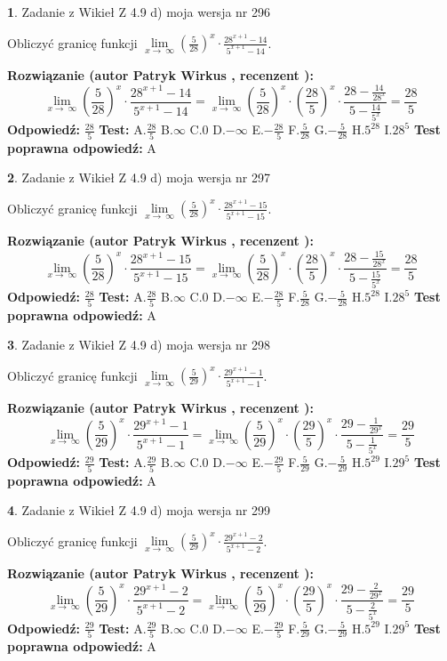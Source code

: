 \documentclass[12pt, a4paper]{article}
\theoremstyle{definition} %
\newtheorem{zad}{}
\newcommand{\zadStart}[1]{\begin{zad}#1\newline}
\newcommand{\zadStop}{\end{zad}}
\newcommand{\rozwStart}[2]{\noindent \textbf{Rozwiązanie (autor #1 , recenzent #2): }\newline}
\newcommand{\rozwStop}{\newline}
\newcommand{\odpStart}{\noindent \textbf{Odpowiedź:}\newline}
\newcommand{\odpStop}{\newline}
\newcommand{\testStart}{\noindent \textbf{Test:}\newline}
\newcommand{\testStop}{\newline}
\newcommand{\kluczStart}{\noindent \textbf{Test poprawna odpowiedź:}\newline}
\newcommand{\kluczStop}{\newline}
\begin{document}
\zadStart{Zadanie z Wikieł Z 4.9 d) moja wersja nr 296}


Obliczyć granicę funkcji  $\lim\limits_{x\to\ \infty}(\frac{5}{28})^{x}\cdot\frac{28^{x+1}-14}{5^{x+1}-14}$.
\zadStop
\rozwStart{Patryk Wirkus}{}
$$\lim\limits_{x\to\ \infty}(\frac{5}{28})^{x}\cdot\frac{28^{x+1}-14}{5^{x+1}-14}=\lim\limits_{x\to\ \infty}(\frac{5}{28})^{x}\cdot(\frac{28}{5})^{x} \cdot \frac{28-\frac{14}{28^{x}}}{5-\frac{14}{5^{x}}} = \frac{28}{5}$$
\rozwStop
\odpStart
$\frac{28}{5}$
\odpStop
\testStart
A.$\frac{28}{5}$ B.$\infty$ C.$0$ D.$-\infty$ E.$-\frac{28}{5}$
F.$\frac{5}{28}$ G.$-\frac{5}{28}$
H.$5^{28}$
I.$28^{5}$
\testStop
\kluczStart
A
\kluczStop



\zadStart{Zadanie z Wikieł Z 4.9 d) moja wersja nr 297}


Obliczyć granicę funkcji  $\lim\limits_{x\to\ \infty}(\frac{5}{28})^{x}\cdot\frac{28^{x+1}-15}{5^{x+1}-15}$.
\zadStop
\rozwStart{Patryk Wirkus}{}
$$\lim\limits_{x\to\ \infty}(\frac{5}{28})^{x}\cdot\frac{28^{x+1}-15}{5^{x+1}-15}=\lim\limits_{x\to\ \infty}(\frac{5}{28})^{x}\cdot(\frac{28}{5})^{x} \cdot \frac{28-\frac{15}{28^{x}}}{5-\frac{15}{5^{x}}} = \frac{28}{5}$$
\rozwStop
\odpStart
$\frac{28}{5}$
\odpStop
\testStart
A.$\frac{28}{5}$ B.$\infty$ C.$0$ D.$-\infty$ E.$-\frac{28}{5}$
F.$\frac{5}{28}$ G.$-\frac{5}{28}$
H.$5^{28}$
I.$28^{5}$
\testStop
\kluczStart
A
\kluczStop



\zadStart{Zadanie z Wikieł Z 4.9 d) moja wersja nr 298}


Obliczyć granicę funkcji  $\lim\limits_{x\to\ \infty}(\frac{5}{29})^{x}\cdot\frac{29^{x+1}-1}{5^{x+1}-1}$.
\zadStop
\rozwStart{Patryk Wirkus}{}
$$\lim\limits_{x\to\ \infty}(\frac{5}{29})^{x}\cdot\frac{29^{x+1}-1}{5^{x+1}-1}=\lim\limits_{x\to\ \infty}(\frac{5}{29})^{x}\cdot(\frac{29}{5})^{x} \cdot \frac{29-\frac{1}{29^{x}}}{5-\frac{1}{5^{x}}} = \frac{29}{5}$$
\rozwStop
\odpStart
$\frac{29}{5}$
\odpStop
\testStart
A.$\frac{29}{5}$ B.$\infty$ C.$0$ D.$-\infty$ E.$-\frac{29}{5}$
F.$\frac{5}{29}$ G.$-\frac{5}{29}$
H.$5^{29}$
I.$29^{5}$
\testStop
\kluczStart
A
\kluczStop



\zadStart{Zadanie z Wikieł Z 4.9 d) moja wersja nr 299}


Obliczyć granicę funkcji  $\lim\limits_{x\to\ \infty}(\frac{5}{29})^{x}\cdot\frac{29^{x+1}-2}{5^{x+1}-2}$.
\zadStop
\rozwStart{Patryk Wirkus}{}
$$\lim\limits_{x\to\ \infty}(\frac{5}{29})^{x}\cdot\frac{29^{x+1}-2}{5^{x+1}-2}=\lim\limits_{x\to\ \infty}(\frac{5}{29})^{x}\cdot(\frac{29}{5})^{x} \cdot \frac{29-\frac{2}{29^{x}}}{5-\frac{2}{5^{x}}} = \frac{29}{5}$$
\rozwStop
\odpStart
$\frac{29}{5}$
\odpStop
\testStart
A.$\frac{29}{5}$ B.$\infty$ C.$0$ D.$-\infty$ E.$-\frac{29}{5}$
F.$\frac{5}{29}$ G.$-\frac{5}{29}$
H.$5^{29}$
I.$29^{5}$
\testStop
\kluczStart
A
\kluczStop
\end{document}
